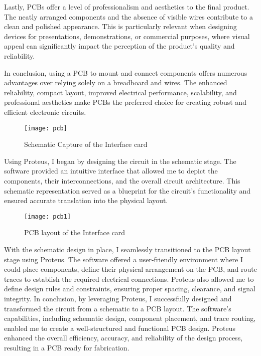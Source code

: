 Lastly, PCBs offer a level of professionalism and aesthetics to the final product. The neatly arranged components and the absence of visible wires contribute to a clean and polished appearance. This is particularly relevant when designing devices for presentations, demonstrations, or commercial purposes, where visual appeal can significantly impact the perception of the product's quality and reliability.

In conclusion, using a PCB to mount and connect components offers numerous advantages over relying solely on a breadboard and wires. The enhanced reliability, compact layout, improved electrical performance, scalability, and professional aesthetics make PCBs the preferred choice for creating robust and efficient electronic circuits.
\begin{figure}[h]
\FloatBarrier
         \centering
        \texttt{[image: pcb]}
   
        \caption{Schematic Capture of the Interface card}
        \label{Schematic Capture of the Interface card}
\FloatBarrier
    \end{figure}
\FloatBarrier
Using Proteus, I began by designing the circuit in the schematic stage. The software provided an intuitive interface that allowed me to depict the components, their interconnections, and the overall circuit architecture. This schematic representation served as a blueprint for the circuit's functionality and ensured accurate translation into the physical layout.
\begin{figure}[h]
\FloatBarrier
         \centering
        \texttt{[image: pcb1]}
   
        \caption{PCB layout of the Interface card}
        \label{PCB layout of the Interface card}
\FloatBarrier
    \end{figure}
\FloatBarrier

With the schematic design in place, I seamlessly transitioned to the PCB layout stage using Proteus. The software offered a user-friendly environment where I could place components, define their physical arrangement on the PCB, and route traces to establish the required electrical connections. Proteus also allowed me to define design rules and constraints, ensuring proper spacing, clearance, and signal integrity.
In conclusion, by leveraging Proteus, I successfully designed and transformed the circuit from a schematic to a PCB layout. The software's capabilities, including schematic design, component placement, and trace routing, enabled me to create a well-structured and functional PCB design. Proteus enhanced the overall efficiency, accuracy, and reliability of the design process, resulting in a PCB ready for fabrication.
%

